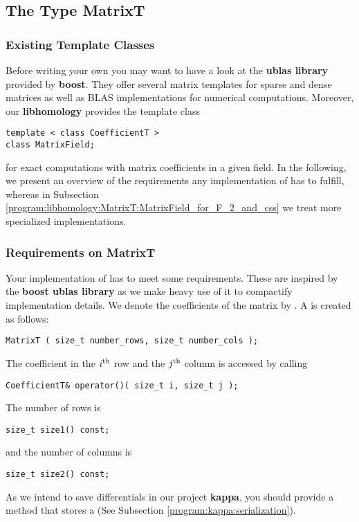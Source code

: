\subsection{The Type MatrixT}
\label{program:libhomology:MatrixT}
\subsubsection{Existing Template Classes}
Before writing your own  you may want to have a look at the {\bf ublas library} provided by {\bf boost}.
They offer several matrix templates for sparse and dense matrices 
as well as BLAS implementations for numerical computations.
Moreover, our {\bf libhomology} provides the template class
\begin{lstlisting}
template < class CoefficientT >
class MatrixField;
\end{lstlisting}
for exact computations with matrix coefficients in a given field.
In the following, we present an overview of the requirements any implementation of  has to fulfill, whereas
in Subsection \ref{program:libhomology:MatrixT:MatrixField_for_F_2_and_css} we treat more specialized implementations.

\subsubsection{Requirements on MatrixT}
Your implementation of  has to meet some requirements.
These are inspired by the {\bf boost ublas library} as we make heavy use of it to compactify implementation details.
We denote the coefficients of the matrix by .
A  is created as follows:
\begin{lstlisting}
MatrixT ( size_t number_rows, size_t number_cols );
\end{lstlisting}
The coefficient in the $i^{\text{th}}$ row and the $j^{\text{th}}$ column is accessed by calling
\begin{lstlisting}
CoefficientT& operator()( size_t i, size_t j );
\end{lstlisting}
The number of rows is 
\begin{lstlisting}
size_t size1() const;
\end{lstlisting}
and the number of columns is
\begin{lstlisting}
size_t size2() const;
\end{lstlisting}

As we intend to save differentials in our project {\bf kappa}, you should provide a method that stores a  (See Subsection \ref{program:kappa:serialization}).

